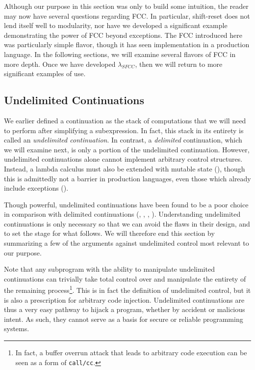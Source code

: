 \documentclass[11pt]{article}
\newcommand{\maybePage}{\newpage}
\begin{document}
Although our purpose in this section was only to build some intuition, the reader may now have several questions regarding FCC.
In particular, shift-reset does not lend itself well to modularity, nor have we developed a significant example demonstrating the power of FCC beyond exceptions.
The FCC introduced here was particularly simple flavor, though it has seen implementation in a production language.
In the following sections, we will examine several flavors of FCC in more depth.
Once we have developed $\lambda_{SFCC}$, then we will return to more significant examples of use.


\maybePage
\subsection{Undelimited Continuations}
\label{undelimControl}

We earlier defined a continuation as the stack of computations that we will need to perform after simplifying a subexpression.
In fact, this stack in its entirety is called an \emph{undelimited continuation}.
In contrast, a \emph{delimited} continuation, which we will examine next, is only a portion of the undelimited continuation.
However, undelimited continuations alone cannot implement arbitrary control structures.
Instead, a lambda calculus must also be extended with mutable state  (\cite{Filinski94}), though this is admittedly not a barrier in production languages, even those which already include exceptions  (\cite{GreatEscape}).

Though powerful, undelimited continuations have been found to be a poor choice in comparison with delimited continuations (\cite{MFDC}, \cite{continuationsInProcObjs}, \cite{HandlingControl}, \cite{Sitaram90}).
Understanding undelimited continuations is only necessary so that we can avoid the flaws in their design, and to set the stage for what follows.
We will therefore end this section by summarizing a few of the arguments against undelimited control most relevant to our purpose.

Note that any subprogram with the ability to manipulate undelimited continuations can trivially take total control over and manipulate the entirety of the remaining process\footnote{In fact, a buffer overrun attack that leads to arbitrary code execution can be seen as a form of \texttt{call/cc}.}.
This is in fact the definition of undelimited control, but it is also a prescription for arbitrary code injection.
Undelimited continuations are thus a very easy pathway to hijack a program, whether by accident or malicious intent.
As such, they cannot serve as a basis for secure or reliable programming systems.
\end{document}
